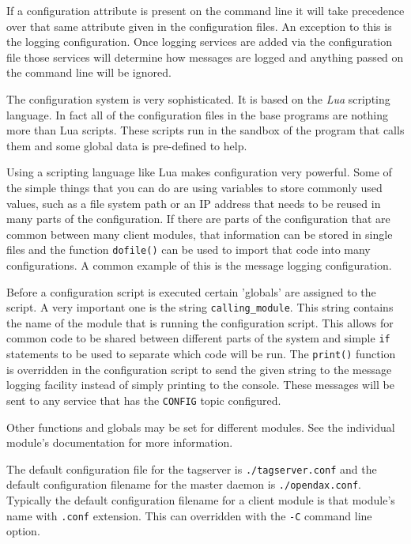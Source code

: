 	If a configuration attribute is present on the command line it will take
	precedence over that same attribute given in the configuration files.  An
	exception to this is the logging configuration.  Once logging services are added
	via the configuration file those services will determine how messages are logged
	and anything passed on the  command line will be ignored.

	The \opendax configuration system is very sophisticated.  It is based on the
	\textit{Lua} scripting language.  In fact all of the configuration files in the
	base \opendax programs are nothing more than Lua scripts.  These scripts run in
	the sandbox of the program that calls them and some global data is pre-defined
	to help.

	Using a scripting language like Lua makes configuration very powerful.  Some of
	the simple things that you can do are using variables to store commonly used
	values, such as a file system path or an IP address that needs to be reused in
	many parts of the configuration.  If there are parts of the configuration that
	are common between many client modules, that information can be stored in single
	files and the function \texttt{dofile()} can be used to import that code into
	many configurations.  A common example of this is the message logging
	configuration.

	Before a configuration script is executed certain 'globals' are assigned to the
	script.  A very important one is the string \texttt{calling\_module}.  This
	string contains the name of the module that is running the configuration script.
	This allows for common code to be shared between different parts of the system
	and simple \texttt{if} statements to be used to separate which code will be run.
	The \texttt{print()} function is overridden in the configuration script to send
	the given string to the message logging facility instead of simply printing to
	the console.  These messages will be sent to any service that has the
	\texttt{CONFIG} topic configured.

	Other functions and globals may be set for different modules.  See the
	individual module's documentation for more information.

	The default configuration file for the tagserver is \texttt{./tagserver.conf}
	and the default configuration filename for the master daemon is
	\texttt{./opendax.conf}.  Typically the default configuration filename for a
	client module is that module's name with \texttt{.conf} extension.  This can
	overridden with the \texttt{-C} command line option.

